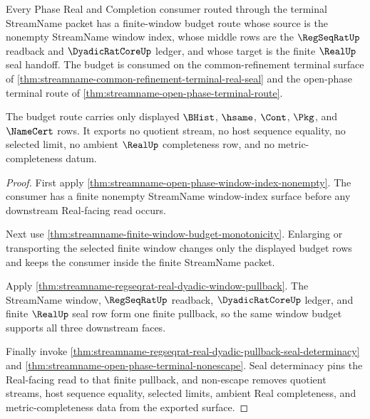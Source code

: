 \begin{theorem}
\label{thm:streamname-open-phase-finite-window-budget}
Every Phase Real and Completion consumer routed through the terminal StreamName packet has a finite-window budget route whose source is the nonempty StreamName window index, whose middle rows are the $\RegSeqRatUp$ readback and $\DyadicRatCoreUp$ ledger, and whose target is the finite $\RealUp$ seal handoff. The budget is consumed on the common-refinement terminal surface of \autoref{thm:streamname-common-refinement-terminal-real-seal} and the open-phase terminal route of \autoref{thm:streamname-open-phase-terminal-route}.

The budget route carries only displayed $\BHist$, $\hsame$, $\Cont$, $\Pkg$, and $\NameCert$ rows. It exports no quotient stream, no host sequence equality, no selected limit, no ambient $\RealUp$ completeness row, and no metric-completeness datum.
\end{theorem}
\begin{proof}
First apply \autoref{thm:streamname-open-phase-window-index-nonempty}. The consumer has a finite nonempty StreamName window-index surface before any downstream Real-facing read occurs.

Next use \autoref{thm:streamname-finite-window-budget-monotonicity}. Enlarging or transporting the selected finite window changes only the displayed budget rows and keeps the consumer inside the finite StreamName packet.

Apply \autoref{thm:streamname-regseqrat-real-dyadic-window-pullback}. The StreamName window, $\RegSeqRatUp$ readback, $\DyadicRatCoreUp$ ledger, and finite $\RealUp$ seal row form one finite pullback, so the same window budget supports all three downstream faces.

Finally invoke \autoref{thm:streamname-regseqrat-real-dyadic-pullback-seal-determinacy} and \autoref{thm:streamname-open-phase-terminal-nonescape}. Seal determinacy pins the Real-facing read to that finite pullback, and non-escape removes quotient streams, host sequence equality, selected limits, ambient Real completeness, and metric-completeness data from the exported surface.
\end{proof}

